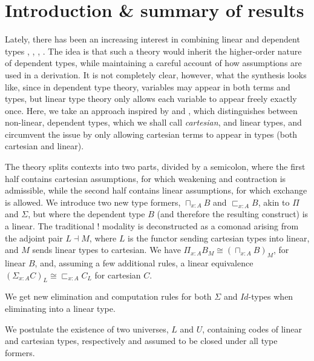 \section{Introduction \& summary of results}
Lately, there has been an increasing interest in combining linear and dependent types  \cite{schreiber2014quantization}, \cite{krishnaswami}, \cite{vakar14}, \cite{nothing}. The idea is that such a theory would inherit the higher-order nature of dependent types, while maintaining a careful account of how assumptions are used in a derivation. It is not completely clear, however, what the synthesis looks like, since in dependent type theory, variables may appear in both terms and types, but linear type theory only allows each variable to appear freely exactly once. Here, we take an approach inspired by \cite{krishnaswami} and \cite{vakar14}, which distinguishes between non-linear, dependent types, which we shall call \textit{cartesian}, and linear types, and circumvent the issue by only allowing cartesian terms to appear in types (both cartesian and linear).

The theory splits contexts into two parts, divided by a semicolon, where the first half contains cartesian assumptions, for which weakening and contraction is admissible, while the second half contains linear assumptions, for which exchange is allowed. We introduce two new type formers, $\sqcap_{x : A}B$ and $\sqsubset_{x : A}B$, akin to $\Pi$ and $\Sigma$, but where the dependent type $B$ (and therefore the resulting construct) is a linear. The traditional $!$ modality is deconstructed as a comonad arising from the adjoint pair $L \dashv M$, where $L$ is the functor sending cartesian types into linear, and $M$ sends linear types to cartesian. We have $\Pi_{x : A}B_M \cong (\sqcap_{x :A}B)_M$, for linear $B$, and, assuming a few additional rules, a linear equivalence $(\Sigma_{x :A}C)_L \cong \sqsubset_{x :A}C_L$ for cartesian $C$.

We get new elimination and computation rules for both $\Sigma$ and $Id$-types when eliminating into a linear type. 

We postulate the existence of two universes, $L$ and $U$, containing codes of linear and cartesian types, respectively and assumed to be closed under all type formers.

